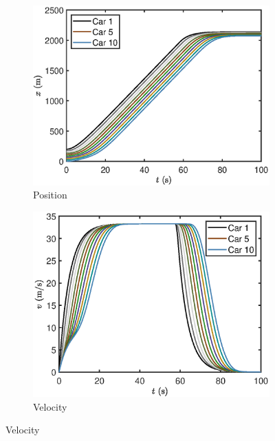 \documentclass[12pt]{article}
\begin{document}
      \begin{figure}[H]
        \centering
        \begin{subfigure}[H]{0.49\textwidth}
          \centering
          \includegraphics[width=\linewidth]{HomogeneousTraffic1.eps}
          \caption{Position}
        \end{subfigure}
        \hfill 
        \begin{subfigure}[H]{0.49\textwidth}
          \includegraphics[width=\linewidth]{HomogeneousTraffic2.eps}
          \centering
          \caption{Velocity}
        \end{subfigure}


\end{figure}
\end{document}

